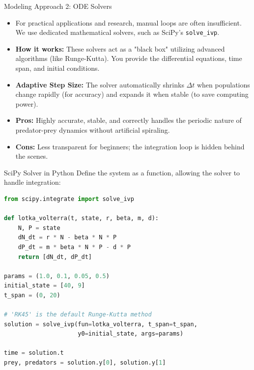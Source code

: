 \begin{frame}{Modeling Approach 2: ODE Solvers}
    \begin{itemize}
        \item For practical applications and research, manual loops are often insufficient. We use dedicated mathematical solvers, such as SciPy's \texttt{solve\_ivp}.
        \vspace{0.5em}
        \item \textbf{How it works:} These solvers act as a "black box" utilizing advanced algorithms (like Runge-Kutta). You provide the differential equations, time span, and initial conditions.
        \item \textbf{Adaptive Step Size:} The solver automatically shrinks $\Delta t$ when populations change rapidly (for accuracy) and expands it when stable (to save computing power).
        \vspace{0.5em}
        \item \textbf{Pros:} Highly accurate, stable, and correctly handles the periodic nature of predator-prey dynamics without artificial spiraling.
        \item \textbf{Cons:} Less transparent for beginners; the integration loop is hidden behind the scenes.
    \end{itemize}
\end{frame}

\begin{frame}[fragile]{SciPy Solver in Python}
    \footnotesize
    Define the system as a function, allowing the solver to handle integration:
    \vspace{0.5em}
    \begin{lstlisting}[language=Python, basicstyle=\ttfamily\scriptsize, keywordstyle=\color{blue}, commentstyle=\color{gray}, frame=single]
from scipy.integrate import solve_ivp

def lotka_volterra(t, state, r, beta, m, d):
    N, P = state
    dN_dt = r * N - beta * N * P
    dP_dt = m * beta * N * P - d * P
    return [dN_dt, dP_dt]

params = (1.0, 0.1, 0.05, 0.5)
initial_state = [40, 9] 
t_span = (0, 20) 

# 'RK45' is the default Runge-Kutta method
solution = solve_ivp(fun=lotka_volterra, t_span=t_span, 
                     y0=initial_state, args=params)

time = solution.t
prey, predators = solution.y[0], solution.y[1]
    \end{lstlisting}
\end{frame}

